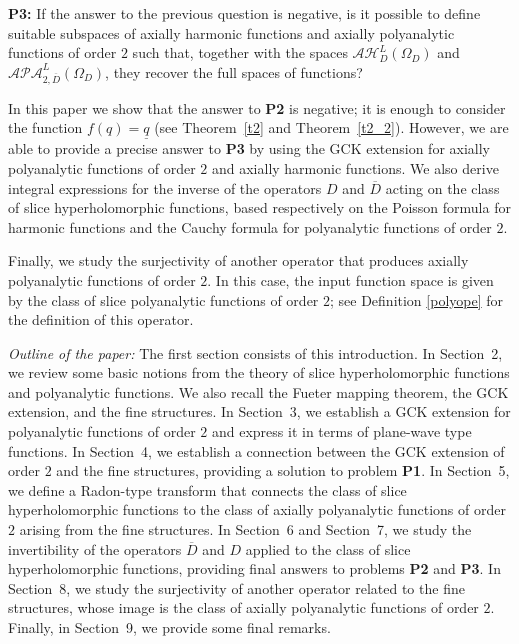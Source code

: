 \documentclass[reqno,11pt]{amsart}
\numberwithin{equation}{section}
\theoremstyle{definition}
\begin{document}
\textbf{P3:} If the answer to the previous question is negative, is it possible to define suitable subspaces of axially harmonic functions and axially polyanalytic functions of order $2$ such that, together with the spaces $\mathcal{AH}_D^L(\Omega_D)$ and $\mathcal{APA}_{2, \overline{D}}^L(\Omega_D)$, they recover the full spaces of functions?

\medskip

In this paper we show that the answer to \textbf{P2} is negative; it is enough to consider the function $f(q)=\underline{q}$ (see Theorem~\ref{t2} and Theorem~\ref{t2_2}). However, we are able to provide a precise answer to \textbf{P3} by using the GCK extension for axially polyanalytic functions of order $2$ and axially harmonic functions. We also derive integral expressions for the inverse of the operators $D$ and $\overline{D}$ acting on the class of slice hyperholomorphic functions, based respectively on the Poisson formula for harmonic functions and the Cauchy formula for polyanalytic functions of order $2$.

\medskip

Finally, we study the surjectivity of another operator that produces axially polyanalytic functions of order $2$. In this case, the input function space is given by the class of slice polyanalytic functions of order $2$; see Definition \ref{polyope} for the definition of this operator.

\medskip


\emph{Outline of the paper:} The first section consists of this introduction. In Section~2, we review some basic notions from the theory of slice hyperholomorphic functions and polyanalytic functions. We also recall the Fueter mapping theorem, the GCK extension, and the fine structures. In Section~3, we establish a GCK extension for polyanalytic functions of order $2$ and express it in terms of plane-wave type functions. In Section~4, we establish a connection between the GCK extension of order $2$ and the fine structures, providing a solution to problem \textbf{P1}. In Section~5, we define a Radon-type transform that connects the class of slice hyperholomorphic functions to the class of axially polyanalytic functions of order $2$ arising from the fine structures. In Section~6 and Section~7, we study the invertibility of the operators $\overline{D}$ and $D$ applied to the class of slice hyperholomorphic functions, providing final answers to problems \textbf{P2} and \textbf{P3}. In Section~8, we study the surjectivity of another operator related to the fine structures, whose image is the class of axially polyanalytic functions of order $2$. Finally, in Section~9, we provide some final remarks.
\end{document}
